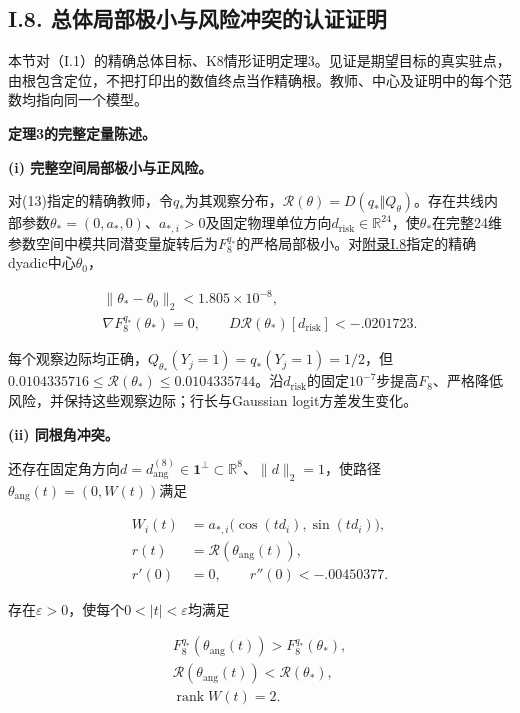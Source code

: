 \documentclass[11pt,a4paper]{article}
\begin{document}
\subsection*{I.8.
总体局部极小与风险冲突的认证证明}\label{proof-theorem-3}

本节对（I.1）的精确总体目标、K8情形证明定理3。见证是期望目标的真实驻点，由根包含定位，不把打印出的数值终点当作精确根。教师、中心及证明中的每个范数均指向同一个模型。

\protect{}\label{full-local-statement}
\textbf{定理3的完整定量陈述。}

\textbf{(i) 完整空间局部极小与正风险。}

对(13)指定的精确教师，令\(q_*\)为其观察分布，\(\mathcal R(\theta)=D(q_*\Vert Q_\theta)\)。存在共线内部参数\(\theta_*=(0,a_*,0)\)、\(a_{*,i}>0\)及固定物理单位方向\(d_{\mathrm{risk}}\in\mathbb R^{24}\)，使\(\theta_*\)在完整24维参数空间中模共同潜变量旋转后为\(F_8^{q_*}\)的严格局部极小。对\hyperref[proof-theorem-3]{附录I.8}指定的精确dyadic中心\(\theta_0\)，

\[
\begin{gathered}
\|\theta_*-\theta_0\|_2<1.805\times10^{-8},\\
\nabla F_8^{q_*}(\theta_*)=0,\qquad
D\mathcal R(\theta_*)[d_{\mathrm{risk}}]<-.0201723.
\end{gathered}
\]

每个观察边际均正确，\(Q_{\theta_*}(Y_j=1)=q_*(Y_j=1)=1/2\)，但\(0.0104335716\le\mathcal R(\theta_*)\le0.0104335744\)。沿\(d_{\mathrm{risk}}\)的固定\(10^{-7}\)步提高\(F_8\)、严格降低风险，并保持这些观察边际；行长与Gaussian
logit方差发生变化。


\textbf{(ii) 同根角冲突。}

还存在固定角方向\(d=d_{\mathrm{ang}}^{(8)}\in\mathbf1^\perp\subset\mathbb R^8\)、\(\|d\|_2=1\)，使路径\(\theta_{\mathrm{ang}}(t)=(0,W(t))\)满足

\[
\begin{aligned}
W_i(t)&=a_{*,i}\bigl(\cos(td_i),\sin(td_i)\bigr),\\
r(t)&=\mathcal R(\theta_{\mathrm{ang}}(t)),\\
r'(0)&=0,\qquad r''(0)<-.00450377.
\end{aligned}
\]

存在\(\varepsilon>0\)，使每个\(0<|t|<\varepsilon\)均满足

\[
\begin{gathered}
F_8^{q_*}(\theta_{\mathrm{ang}}(t))>F_8^{q_*}(\theta_*),\\
\mathcal R(\theta_{\mathrm{ang}}(t))<\mathcal R(\theta_*),\\
\operatorname{rank}W(t)=2.
\end{gathered}
\]
\end{document}
